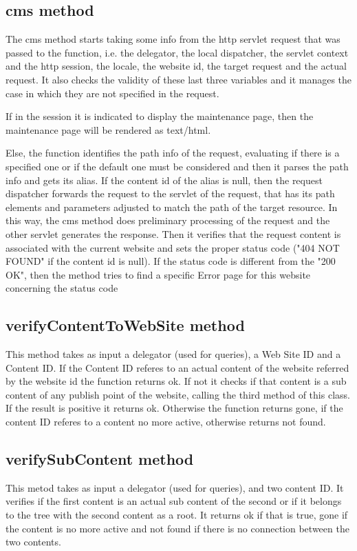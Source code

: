 \subsection{cms method}

The cms method starts taking some info from the http servlet request that was passed to the function, i.e. the delegator, the local dispatcher, the servlet context and the http session, the locale, the website id, the target request and the actual request. It also checks the validity of these last three variables and it manages the case in which they are not specified in the request.

If in the session it is indicated to display the maintenance page, then the maintenance page will be rendered as text/html.

Else, the function identifies the path info of the request, evaluating if there is a specified one or if the default one must be considered and then it parses the path info and gets its alias.
If the content id of the alias is null, then the request dispatcher forwards the request to the servlet of the request, that has its path elements and parameters adjusted to match the path of the target resource. In this way, the cms method does preliminary processing of the request and the other servlet generates the response. 
Then it verifies that the request content is associated with the current website and sets the proper status code ("404 NOT FOUND" if the content id is null). If the status code is different from the "200 OK", then the method tries to find a specific Error page for this website concerning the status code

\subsection{verifyContentToWebSite method}
This method takes as input a delegator (used for queries), a Web Site ID and a Content ID. If the Content ID referes to an actual content of the website referred by the website id the function returns ok. If not it checks if that content is a sub content of any publish point of the website, calling the third method of this class. If the result is positive it returns ok. Otherwise the function returns gone, if the content ID referes to a content no more active, otherwise returns not found.

\subsection{verifySubContent method}
This metod takes as input a delegator (used for queries), and two content ID. It verifies if the first content is an actual sub content of the second or if it belongs to the tree with the second content as a root. It returns ok if that is true, gone if the content is no more active and not found if there is no connection between the two contents.